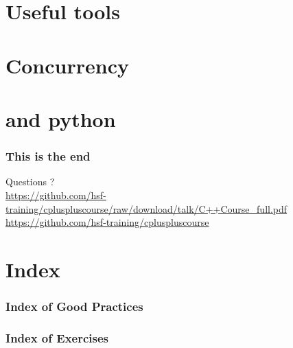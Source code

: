 \documentclass[compress]{beamer}
\begin{document}
\section[Tool]{Useful tools}






\begin{advanced}
  
  
  
  
  

  \section[conc]{Concurrency}
  
  
  
  
  

  \section[py]{\cpp and python}
  
  
  
  
\end{advanced}

\begin{frame}
  \frametitle{This is the end}
  \begin{center}
    \Huge Questions ?\\
    \vspace{.5cm}
    \tiny \url{https://github.com/hsf-training/cpluspluscourse/raw/download/talk/C++Course\_full.pdf}\\
    \tiny \url{https://github.com/hsf-training/cpluspluscourse}
  \end{center}
\end{frame}

\appendix

\section*{Index}

\begin{frame}
  \frametitle{Index of Good Practices}
  \listofgoodpractices
\end{frame}

\begin{frame}
  \frametitle{Index of Exercises}
  \listofexercises
\end{frame}
\end{document}
